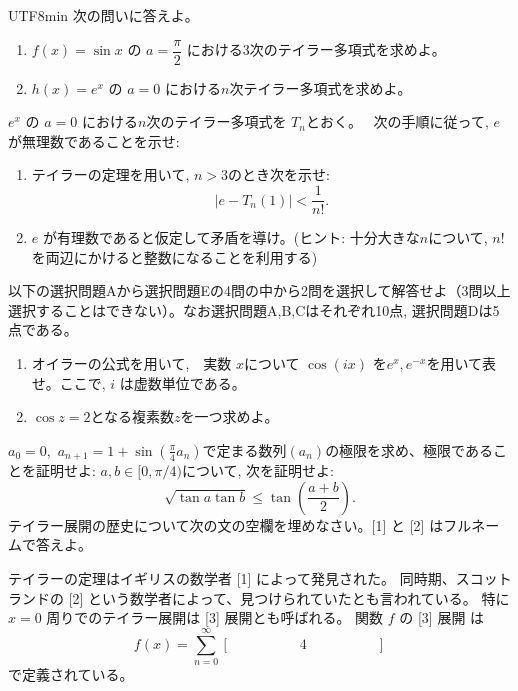 \documentclass[a4paper,12pt]{article}
\begin{document}
\begin{CJK}{UTF8}{min}
次の問いに答えよ。

\begin{enumerate}
\item $f(x)=\sin x$ の $a=\dfrac{\pi}{2}$ における3次のテイラー多項式を求めよ。
\item $h(x)=e^{x}$ の $a=0$ における$n$次テイラー多項式を求めよ。
\end{enumerate}

 $e^x$ の $a=0$ における$n$次のテイラー多項式を $T_n$とおく。　
次の手順に従って, $e$が無理数であることを示せ: 
\begin{enumerate}
\item テイラーの定理を用いて, $n>3$のとき次を示せ:
$$|e - T_n(1)|<\frac{1}{n!} .$$
\item $e$ が有理数であると仮定して矛盾を導け。(ヒント: 十分大きな$n$について, $n!$を両辺にかけると整数になることを利用する)
\end{enumerate}

\vspace{4mm}
 
\noindent 以下の選択問題Aから選択問題Eの4問の中から2問を選択して解答せよ（3問以上選択することはできない）。なお選択問題A,B,Cはそれぞれ10点, 選択問題Dは5点である。

\begin{enumerate}
\item オイラーの公式を用いて,　実数 $x$について $\cos{(i x)}$ を$e^x,e^{-x}$を用いて表せ。ここで, $i$ は虚数単位である。
\item $\cos{z}=2$となる複素数$z$を一つ求めよ。
\end{enumerate}
$a_0=0,$ $a_{n+1}=1+\sin{\left(\frac{\pi}{4} a_n \right)}$で定まる数列$(a_n)$の極限を求め、極限であることを証明せよ:
$a,b\in [0,\pi/4)$について, 次を証明せよ:
$$\sqrt{\tan a  \tan b}\leq \tan(\frac{a+b}{2}).$$
テイラー展開の歴史について次の文の空欄を埋めなさい。[\hspace{3em}1\hspace{3em}] と [\hspace{3em}2\hspace{3em}] はフルネームで答えよ。

テイラーの定理はイギリスの数学者 [\hspace{3em}1\hspace{3em}] によって発見された。
同時期、スコットランドの [\hspace{3em}2\hspace{3em}] という数学者によって、見つけられていたとも言われている。
特に $x=0$ 周りでのテイラー展開は [\hspace{3em}3\hspace{3em}] 展開とも呼ばれる。
関数 $f$ の [\hspace{3em}3\hspace{3em}] 展開 は
$$
f(x) = \sum_{n=0}^{\infty} [\hspace{5em}4\hspace{5em}]
$$
で定義されている。

\ifPDFTeX
\end{CJK}
\fi
\end{document}
